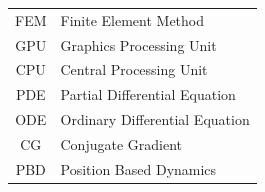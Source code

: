\documentclass[en]{minipw} %
\begin{document}
\begin{tabular}{cl}
FEM & Finite Element Method \\
GPU & Graphics Processing Unit \\
CPU & Central Processing Unit \\
PDE & Partial Differential Equation \\
ODE & Ordinary Differential Equation \\
CG & Conjugate Gradient \\
PBD & Position Based Dynamics \\
\end{tabular}


\renewcommand{\listfigurename}{List of figures}
\listoffigures


\renewcommand{\listtablename}{List of tables}
\listoftables




\end{document}
